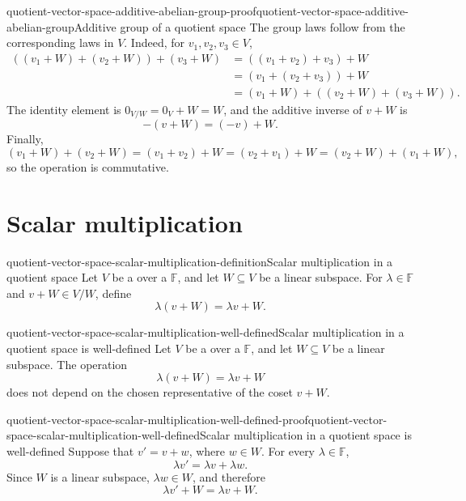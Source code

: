 \documentclass[preview]{standalone}
\begin{document}
\begin{snippetproof}{quotient-vector-space-additive-abelian-group-proof}{quotient-vector-space-additive-abelian-group}{Additive group of a quotient space}
    The group laws follow from the corresponding laws in \(V\). Indeed,
    for \(v_1,v_2,v_3\in V\),
    \begin{align*}
        ((v_1+W)+(v_2+W))+(v_3+W)
        &=((v_1+v_2)+v_3)+W \\
        &=(v_1+(v_2+v_3))+W \\
        &=(v_1+W)+((v_2+W)+(v_3+W)).
    \end{align*}
    The identity element is \(0_{V/W}=0_V+W=W\), and the additive inverse
    of \(v+W\) is
    \[
        -(v+W)=(-v)+W.
    \]
    Finally,
    \[
        (v_1+W)+(v_2+W)
        =(v_1+v_2)+W
        =(v_2+v_1)+W
        =(v_2+W)+(v_1+W),
    \]
    so the operation is commutative.
\end{snippetproof}

\section{Scalar multiplication}

\begin{snippetdefinition}{quotient-vector-space-scalar-multiplication-definition}{Scalar multiplication in a quotient space}
    Let \(V\) be a \vectorspace over a \field \(\mathbb{F}\), and let
    \(W\subseteq V\) be a linear subspace. For \(\lambda\in\mathbb{F}\) and
    \(v+W\in V/W\), define
    \[
        \lambda(v+W)=\lambda v+W.
    \]
\end{snippetdefinition}

\begin{snippetproposition}{quotient-vector-space-scalar-multiplication-well-defined}{Scalar multiplication in a quotient space is well-defined}
    Let \(V\) be a \vectorspace over a \field \(\mathbb{F}\), and let
    \(W\subseteq V\) be a linear subspace. The operation
    \[
        \lambda(v+W)=\lambda v+W
    \]
    does not depend on the chosen representative of the coset \(v+W\).
\end{snippetproposition}

\begin{snippetproof}{quotient-vector-space-scalar-multiplication-well-defined-proof}{quotient-vector-space-scalar-multiplication-well-defined}{Scalar multiplication in a quotient space is well-defined}
    Suppose that \(v'=v+w\), where \(w\in W\). For every
    \(\lambda\in\mathbb{F}\),
    \[
        \lambda v'=\lambda v+\lambda w.
    \]
    Since \(W\) is a linear subspace, \(\lambda w\in W\), and therefore
    \[
        \lambda v'+W=\lambda v+W.
    \]
\end{snippetproof}
\end{document}
